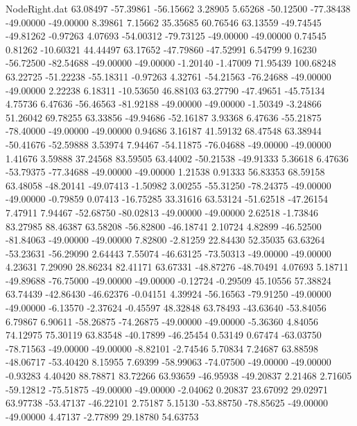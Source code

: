 \begin{filecontents}{NodeRight.dat}
  63.08497  -57.39861  -56.15662     3.28905    5.65268  -50.12500  -77.38438  -49.00000  -49.00000    8.39861    7.15662   35.35685   60.76546
  63.13559  -49.74545  -49.81262    -0.97263    4.07693  -54.00312  -79.73125  -49.00000  -49.00000    0.74545    0.81262  -10.60321   44.44497
  63.17652  -47.79860  -47.52991     6.54799    9.16230  -56.72500  -82.54688  -49.00000  -49.00000   -1.20140   -1.47009   71.95439  100.68248
  63.22725  -51.22238  -55.18311    -0.97263    4.32761  -54.21563  -76.24688  -49.00000  -49.00000    2.22238    6.18311  -10.53650   46.88103
  63.27790  -47.49651  -45.75134     4.75736    6.47636  -56.46563  -81.92188  -49.00000  -49.00000   -1.50349   -3.24866   51.26042   69.78255
  63.33856  -49.94686  -52.16187     3.93368    6.47636  -55.21875  -78.40000  -49.00000  -49.00000    0.94686    3.16187   41.59132   68.47548
  63.38944  -50.41676  -52.59888     3.53974    7.94467  -54.11875  -76.04688  -49.00000  -49.00000    1.41676    3.59888   37.24568   83.59505
  63.44002  -50.21538  -49.91333     5.36618    6.47636  -53.79375  -77.34688  -49.00000  -49.00000    1.21538    0.91333   56.83353   68.59158
  63.48058  -48.20141  -49.07413    -1.50982    3.00255  -55.31250  -78.24375  -49.00000  -49.00000   -0.79859    0.07413  -16.75285   33.31616
  63.53124  -51.62518  -47.26154     7.47911    7.94467  -52.68750  -80.02813  -49.00000  -49.00000    2.62518   -1.73846   83.27985   88.46387
  63.58208  -56.82800  -46.18741     2.10724    4.82899  -46.52500  -81.84063  -49.00000  -49.00000    7.82800   -2.81259   22.84430   52.35035
  63.63264  -53.23631  -56.29090     2.64443    7.55074  -46.63125  -73.50313  -49.00000  -49.00000    4.23631    7.29090   28.86234   82.41171
  63.67331  -48.87276  -48.70491     4.07693    5.18711  -49.89688  -76.75000  -49.00000  -49.00000   -0.12724   -0.29509   45.10556   57.38824
  63.74439  -42.86430  -46.62376    -0.04151    4.39924  -56.16563  -79.91250  -49.00000  -49.00000   -6.13570   -2.37624   -0.45597   48.32848
  63.78493  -43.63640  -53.84056     6.79867    6.90611  -58.26875  -74.26875  -49.00000  -49.00000   -5.36360    4.84056   74.12975   75.30119
  63.83548  -40.17899  -46.25454     0.53149    0.67474  -63.03750  -78.71563  -49.00000  -49.00000   -8.82101   -2.74546    5.70834    7.24687
  63.88598  -48.06717  -53.40420     8.15955    7.69399  -58.99063  -74.07500  -49.00000  -49.00000   -0.93283    4.40420   88.78871   83.72266
  63.93659  -46.95938  -49.20837     2.21468    2.71605  -59.12812  -75.51875  -49.00000  -49.00000   -2.04062    0.20837   23.67092   29.02971
  63.97738  -53.47137  -46.22101     2.75187    5.15130  -53.88750  -78.85625  -49.00000  -49.00000    4.47137   -2.77899   29.18780   54.63753

\end{filecontents}
